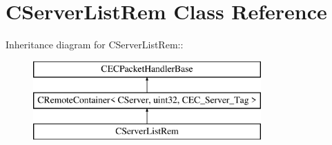 \section{CServerListRem Class Reference}
\label{classCServerListRem}
Inheritance diagram for CServerListRem::\begin{figure}[H]
\begin{center}
\leavevmode
\includegraphics[height=3cm]{classCServerListRem}
\end{center}
\end{figure}
